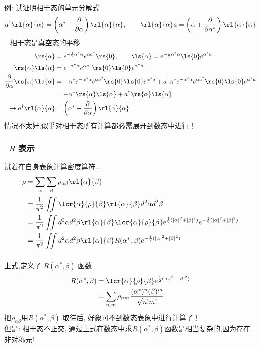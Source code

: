 \begin{frame} 
\frametitle{}
  例: 试证明相干态的单元分解式
  \[ a^{\dagger} \rl{\alpha}{\alpha}= \left( \alpha^* + \frac{\partial }{\partial \alpha }\right) \rl{\alpha}{\alpha}, \qquad  \rl{\alpha}{\alpha} a = \left( \alpha + \frac{\partial }{\partial \alpha^* }\right) \rl{\alpha}{\alpha} \] 
  \证~ 相干态是真空态的平移
  \[ \begin{aligned}
    \rs{\alpha} &= e^{-\frac{1}{2} \alpha^* \alpha} e^{\alpha a^{\dagger}} \rs{0}, \qquad      \ls{\alpha} = e^{-\frac{1}{2} \alpha^* \alpha}  \ls{0} e^{\alpha^* a}\\
    \rs{\alpha}\ls{\alpha} &= e^{ - \alpha^* \alpha} e^{\alpha a^{\dagger}}\rs{0}\ls{0}e^{\alpha^* a}\\
    \frac{\partial }{\partial \alpha} \rs{\alpha}\ls{\alpha} &= - \alpha^* e^{ -\alpha^* \alpha} e^{\alpha a^{\dagger}}\rs{0}\ls{0}e^{\alpha^* a} + a^{\dagger} \alpha^*e^{ -\alpha^* \alpha} e^{\alpha a^{\dagger}}\rs{0}\ls{0}e^{\alpha^* a}\\
    &= - \alpha^* \rs{\alpha}\ls{\alpha} + a^{\dagger} \rs{\alpha}\ls{\alpha} \\ 
    \to a^{\dagger} \rl{\alpha}{\alpha} &= \left( \alpha^* + \frac{\partial }{\partial \alpha }\right) \rl{\alpha}{\alpha} 
  \end{aligned}\] 
  情况不太好,似乎对相干态所有计算都必需展开到数态中进行！
\end{frame}

\begin{frame} 
  \frametitle{~$R$ 表示}
  试着在自身表象计算密度算符...
  \[ \begin{aligned}
    \rho  &= \sum_\alpha\sum_\beta \rho_{\alpha \beta}\rl{\alpha}{\beta} \\
    &= \frac{1}{\pi^2} \iint \lcr{\alpha} {\rho} {\beta} \rl{\alpha}{\beta} d^2 \alpha d^2 \beta  \\
    &=\frac{1}{\pi^2} \iint d^2 \alpha d^2 \beta \rl{\alpha}{\beta} \lcr{\alpha} {\rho} {\beta} e^{\frac{1}{2}(\left|\alpha\right|^2+ \left| \beta\right|^2)}e^{-\frac{1}{2}(\left|\alpha\right|^2+ \left| \beta\right|^2)} \\ 
    &= \frac{1}{\pi^2} \iint d^2 \alpha d^2 \beta \rl{\alpha}{\beta} R(\alpha^*, \beta)e^{-\frac{1}{2}(\left|\alpha\right|^2+ \left| \beta\right|^2)} 
  \end{aligned}\]
  \end{frame}
  
  \begin{frame} 
      \frametitle{} 
  上式,定义了 $R(\alpha^*, \beta) $ 函数
  \[ \begin{aligned}
    R(\alpha^*, \beta) &= \lcr{\alpha} {\rho} {\beta} e^{\frac{1}{2}(\left|\alpha\right|^2+ \left| \beta\right|^2)} \\
    &= \sum_{n,m} \rho_{nm} \frac{(\alpha^*)^n (\beta)^m}{\sqrt{n! m!}}\\
  \end{aligned}\] 
  把$\rho_{\alpha\beta} $用$R(\alpha^*, \beta) $ 取待后, 好象可不到数态表象中进行计算了！\\ 
  但是: 相干态不正交, 通过上式在数态中求$R(\alpha^*, \beta)$函数是相当复杂的,因为存在非对称元!
 \end{frame}

